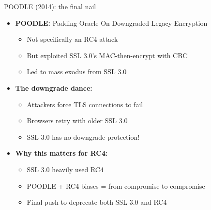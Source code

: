 \documentclass[aspectratio=169, lualatex, handout]{beamer}
\begin{document}
\begin{frame}{POODLE (2014): the final nail}
	\begin{itemize}[<+->]
		\item \textbf{POODLE:} Padding Oracle On Downgraded Legacy Encryption
		      \begin{itemize}[<+->]
			      \item Not specifically an RC4 attack
			      \item But exploited SSL 3.0's MAC-then-encrypt with CBC
			      \item Led to mass exodus from SSL 3.0
		      \end{itemize}
		\item \textbf{The downgrade dance:}
		      \begin{itemize}[<+->]
			      \item Attackers force TLS connections to fail
			      \item Browsers retry with older SSL 3.0
			      \item SSL 3.0 has no downgrade protection!
		      \end{itemize}
		\item \textbf{Why this matters for RC4:}
		      \begin{itemize}[<+->]
			      \item SSL 3.0 heavily used RC4
			      \item POODLE + RC4 biases = from compromise to compromise
			      \item Final push to deprecate both SSL 3.0 and RC4
		      \end{itemize}
	\end{itemize}
\end{frame}
\end{document}

